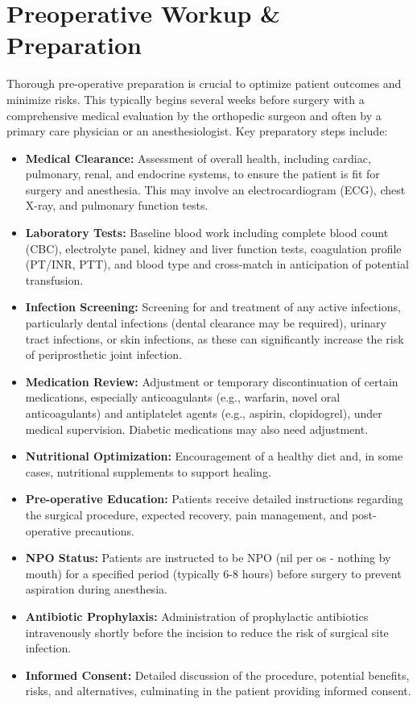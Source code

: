 \section*{Preoperative Workup \& Preparation}
Thorough pre-operative preparation is crucial to optimize patient outcomes and minimize risks. This typically begins several weeks before surgery with a comprehensive medical evaluation by the orthopedic surgeon and often by a primary care physician or an anesthesiologist. Key preparatory steps include:
\begin{itemize}
  \item \textbf{Medical Clearance:} Assessment of overall health, including cardiac, pulmonary, renal, and endocrine systems, to ensure the patient is fit for surgery and anesthesia. This may involve an electrocardiogram (ECG), chest X-ray, and pulmonary function tests.
  \item \textbf{Laboratory Tests:} Baseline blood work including complete blood count (CBC), electrolyte panel, kidney and liver function tests, coagulation profile (PT/INR, PTT), and blood type and cross-match in anticipation of potential transfusion.
  \item \textbf{Infection Screening:} Screening for and treatment of any active infections, particularly dental infections (dental clearance may be required), urinary tract infections, or skin infections, as these can significantly increase the risk of periprosthetic joint infection.
  \item \textbf{Medication Review:} Adjustment or temporary discontinuation of certain medications, especially anticoagulants (e.g., warfarin, novel oral anticoagulants) and antiplatelet agents (e.g., aspirin, clopidogrel), under medical supervision. Diabetic medications may also need adjustment.
  \item \textbf{Nutritional Optimization:} Encouragement of a healthy diet and, in some cases, nutritional supplements to support healing.
  \item \textbf{Pre-operative Education:} Patients receive detailed instructions regarding the surgical procedure, expected recovery, pain management, and post-operative precautions.
  \item \textbf{NPO Status:} Patients are instructed to be NPO (nil per os - nothing by mouth) for a specified period (typically 6-8 hours) before surgery to prevent aspiration during anesthesia.
  \item \textbf{Antibiotic Prophylaxis:} Administration of prophylactic antibiotics intravenously shortly before the incision to reduce the risk of surgical site infection.
  \item \textbf{Informed Consent:} Detailed discussion of the procedure, potential benefits, risks, and alternatives, culminating in the patient providing informed consent.
\end{itemize}

